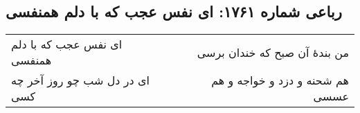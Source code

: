 \begin{center}
\section*{رباعی شماره ۱۷۶۱: ای نفس عجب که با دلم همنفسی}
\label{sec:1761}
\begin{longtable}{l p{0.5cm} r}
ای نفس عجب که با دلم همنفسی
&&
من بندهٔ آن صبح که خندان برسی
\\
ای در دل شب چو روز آخر چه کسی
&&
هم شحنه و دزد و خواجه و هم عسسی
\\
\end{longtable}
\end{center}
